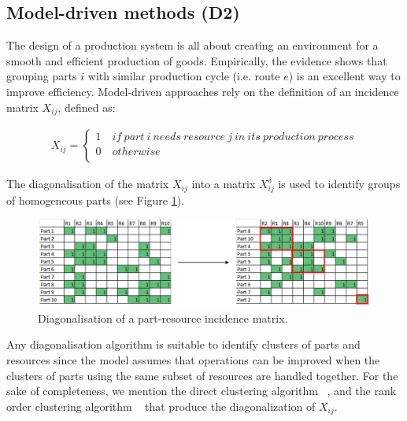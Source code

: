 \subsection{Model-driven methods (D2)}

The design of a production system is all about creating an environment for a smooth and efficient production of goods. Empirically, the evidence shows that grouping parts $i$ with similar production cycle (i.e. route $e$) is an excellent way to improve efficiency. Model-driven approaches rely on the definition of an incidence matrix $X_{ij}$, defined as:

\begin{equation}
   \begin{split}
   X_{ij}=\left\{
                \begin{array}{ll}
                  1\ & if\ part\ i\ needs\ resource\ j\ in\ its\ production\ process\\
                  0 & otherwise\\
                \end{array}
              \right.
   \end{split}
\end{equation}

The diagonalisation of the matrix $X_{ij}$ into a matrix $X_{ij}^\delta$ is used to identify groups of homogeneous parts (see Figure \ref{fig_prod_matrix_diagonalisation}).

\begin{figure}[hbt!]
\centering
\includegraphics[width=1\textwidth]{sectionProduction/design_plant_figures/fig_prod_matrix_diagonalisation.png}
\captionsetup{type=figure}
\caption{Diagonalisation of a part-resource incidence matrix.}
\label{fig_prod_matrix_diagonalisation}
\end{figure}

Any diagonalisation algorithm is suitable to identify clusters of parts and resources since the model assumes that operations can be improved when the clusters of parts using the same subset of resources are handled together. For the sake of completeness, we mention the direct clustering algorithm ~\cite{Chan1982}, and the rank order clustering algorithm ~\cite{King1980} that produce the diagonalization of $X_{ij}$. \par


